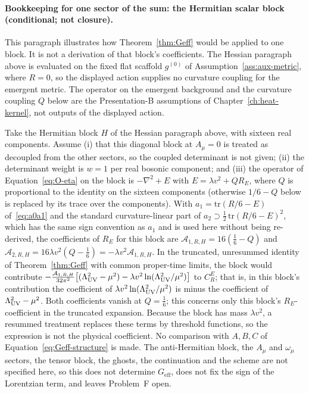 \paragraph{Bookkeeping for one sector of the sum: the Hermitian scalar
block (conditional; not closure).}
This paragraph illustrates how Theorem~\ref{thm:Geff} would be applied
to one block.  It is not a derivation of that block's coefficients.
The Hessian paragraph above is evaluated on the fixed flat scaffold
\(g^{(0)}\) of Assumption~\ref{ass:aux-metric}, where \(R=0\), so the
displayed action supplies no curvature coupling for the emergent
metric.  The operator on the emergent background and the curvature
coupling \(Q\) below are the Presentation-B assumptions of
Chapter~\ref{ch:heat-kernel}, not outputs of the displayed action.

Take the Hermitian block \(H\) of the Hessian paragraph above, with sixteen real
components.  Assume (i) that this diagonal block at \(A_\mu=0\) is
treated as decoupled from the other sectors, so the coupled determinant
is not given; (ii) the determinant weight is \(w=1\) per real bosonic
component; and (iii) the operator of Equation~\eqref{eq:O-eta} on the
block is \(-\nabla^2+E\) with \(E=\lambda v^2+QR_E\), where \(Q\) is
proportional to the identity on the sixteen components (otherwise
\(1/6-Q\) below is replaced by its trace over the components).  With
\(a_1=\mathrm{tr}(R/6-E)\) of~\eqref{eq:a0a1} and the standard
curvature-linear part of
\(a_2\supset\tfrac12\,\mathrm{tr}(R/6-E)^2\), which has the same sign
convention as \(a_1\) and is used here without being re-derived, the
coefficients of \(R_E\) for this block are
\(\mathcal A_{1,R,H}=16(\tfrac16-Q)\) and
\(\mathcal A_{2,R,H}=16\lambda v^2(Q-\tfrac16)=-\lambda v^2\mathcal A_{1,R,H}\).
In the truncated, unresummed identity of Theorem~\ref{thm:Geff} with
common proper-time limits, the block would contribute
\(-\frac{\mathcal A_{1,R,H}}{32\pi^2}\bigl[(\Lambda_{\mathrm{UV}}^2-\mu^2)
-\lambda v^2\ln(\Lambda_{\mathrm{UV}}^2/\mu^2)\bigr]\) to \(C_R^E\); that is, in this
block's contribution the coefficient of \(\lambda v^2\ln(\Lambda_{\mathrm{UV}}^2/\mu^2)\)
is minus the coefficient of \(\Lambda_{\mathrm{UV}}^2-\mu^2\).  Both coefficients vanish
at \(Q=\tfrac16\); this concerns only this block's \(R_E\)-coefficient
in the truncated expansion.  Because the block has mass \(\lambda v^2\),
a resummed treatment replaces these terms by threshold functions, so
the expression is not the physical coefficient.  No comparison with
\(A,B,C\) of Equation~\eqref{eq:Geff-structure} is made.  The
anti-Hermitian block, the \(A_\mu\) and \(\omega_\mu\) sectors, the
tensor block, the ghosts, the continuation and the scheme are not
specified here, so this does not determine \(G_{\mathrm{eff}}\), does
not fix the sign of the Lorentzian term, and leaves Problem~F open.

